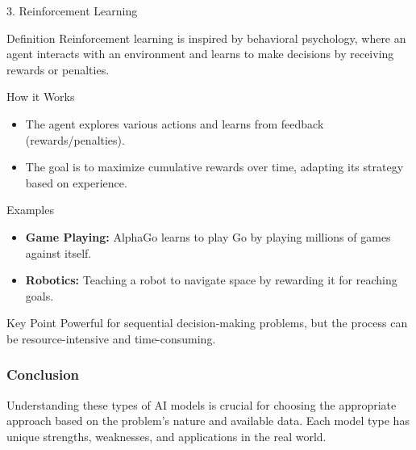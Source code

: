 \documentclass[aspectratio=169]{beamer}
\begin{document}
\begin{frame}{3. Reinforcement Learning}
    \begin{block}{Definition}
        Reinforcement learning is inspired by behavioral psychology, where an agent interacts with an environment and learns to make decisions by receiving rewards or penalties.
    \end{block}

    \begin{block}{How it Works}
        \begin{itemize}
            \item The agent explores various actions and learns from feedback (rewards/penalties).
            \item The goal is to maximize cumulative rewards over time, adapting its strategy based on experience.
        \end{itemize}
    \end{block}

    \begin{block}{Examples}
        \begin{itemize}
            \item \textbf{Game Playing:} AlphaGo learns to play Go by playing millions of games against itself.
            \item \textbf{Robotics:} Teaching a robot to navigate space by rewarding it for reaching goals.
        \end{itemize}
    \end{block}
  
    \begin{block}{Key Point}
        Powerful for sequential decision-making problems, but the process can be resource-intensive and time-consuming.
    \end{block}
\end{frame}

\begin{frame}[fragile]
    \frametitle{Conclusion}
    Understanding these types of AI models is crucial for choosing the appropriate approach based on the problem's nature and available data. Each model type has unique strengths, weaknesses, and applications in the real world.
\end{frame}
\end{document}
